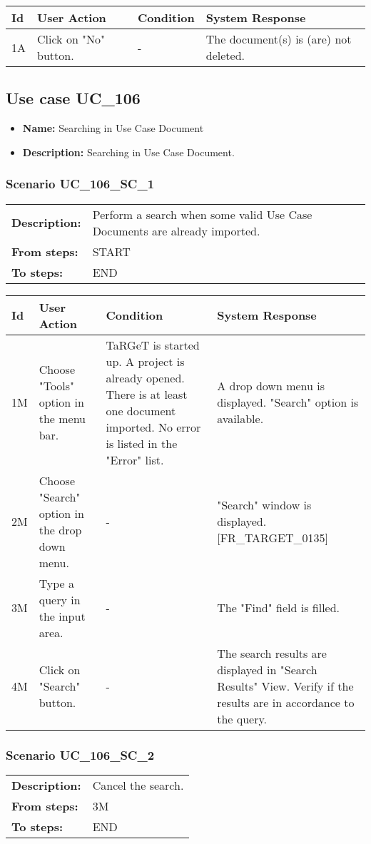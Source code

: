 \documentclass[a4paper,11pt]{article}
\newcommand{\bl}{\\ \hline}
\begin{document}
\begin{tabular}{|p{0.8in}|p{1.6in}|p{1.6in}|p{1.6in}|}
\hline
Id & User Action & Condition & System Response  \bl 
1A & Click on "No" button. & - & The document(s) is (are) not deleted. \bl 
\end{tabular}
\subsection*{Use case UC_106}
\begin{itemize}
\item {\bf Name: }Searching in Use Case Document
\item {\bf Description: }Searching in Use Case Document.
\end{itemize}
\subsubsection*{Scenario UC_106_SC_1}
\begin{tabular}{p{1in}p{4in}}
{\bf Description:} & Perform a search when some valid Use Case Documents are already imported. \\
{\bf From steps:} & START \\
{\bf To steps:} & END \\
\end{tabular}
 
\begin{tabular}{|p{0.8in}|p{1.6in}|p{1.6in}|p{1.6in}|}
\hline
Id & User Action & Condition & System Response  \bl 
1M & Choose "Tools" option in the menu bar. & TaRGeT is started up. A project is already opened. There is at least one document imported. No error is listed in the "Error" list. & A drop down menu is displayed. "Search" option is available. \bl 
2M & Choose "Search" option in the drop down menu. & - & "Search" window is displayed. [FR_TARGET_0135] \bl 
3M & Type a query in the input area. & - & The "Find" field is filled. \bl 
4M & Click on "Search" button. & - & The search results are displayed in "Search Results" View. Verify if the results are in accordance to the query. \bl 
\end{tabular}
\subsubsection*{Scenario UC_106_SC_2}
\begin{tabular}{p{1in}p{4in}}
{\bf Description:} & Cancel the search. \\
{\bf From steps:} & 3M \\
{\bf To steps:} & END \\
\end{tabular}
 
\end{document}
